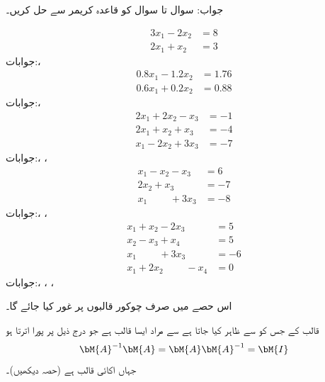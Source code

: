 جواب:
سوال  تا سوال  کو قاعدہ کریمر سے حل کریں۔

\begin{align*}
3x_1-2x_2&=8\\
2x_1+x_2&=3
\end{align*}
جوابات:، 
\begin{align*}
0.8x_1-1.2x_2&=1.76\\
0.6x_1+0.2x_2&=0.88
\end{align*}
جوابات:، 
\begin{align*}
2x_1+2x_2-x_3&=-1\\
2x_1+x_2+x_3&=-4\\
x_1-2x_2+3x_3&=-7
\end{align*}
جوابات:، ، 
\begin{align*}
x_1-x_2-x_3&=6\\
2x_2+x_3&=-7\\
x_1\phantom{-2x_2}+3x_3&=-8
\end{align*}
جوابات:، ، 
\begin{align*}
x_1+x_2-2x_3\phantom{+x_4}&=5\\
x_2-x_3+x_4&=5\\
x_1\phantom{+2x_2}+3x_3\phantom{-x_4}&=-6\\
x_1+2x_2\phantom{+3x_3}-x_4&=0
\end{align*}
جوابات:، ، ،  

اس حصے میں صرف چوکور قالبوں پر غور کیا جائے گا۔ 

 قالب  کے  جس کو  سے ظاہر کیا جاتا ہے سے مراد ایسا  قالب ہے جو درج ذیل پر پورا اترتا ہو
\begin{align}\label{مساوات_الجبرا_جارڈن_گاوس_اسقاط}
\bM{A}^{-1}\bM{A}=\bM{A}\bM{A}^{-1}=\bM{I}
\end{align}
جہاں  اکائی  قالب ہے (حصہ  دیکھیں)۔

